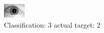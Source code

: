 \begin{figure}[h!]
\begin{center}
\includegraphics[width=0.60\columnwidth]{figures/ID1646_class_3_target_2.png}
\end{center}
\caption{ Classification: 3 actual target: 2}
\label{fig:ID1646_class_3_target_2}
\end{figure}
